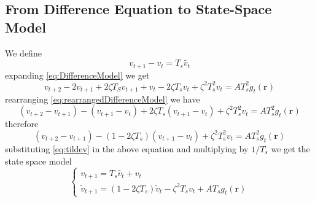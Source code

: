 \documentclass[a4paper,10pt]{article}
\begin{document}
\subsection*{From Difference Equation to State-Space Model}
We define
\begin{equation}\label{eq:tildev}
v_{t+1}-v_t=T_s\tilde{v_t}
\end{equation}
expanding \eqref{eq:DifferenceModel} we get
\begin{equation}\label{eq:rearrangedDifferenceModel}
 v_{t+2}-2v_{t+1}+2\zeta T_S v_{t+1}+v_t-2\zeta T_sv_t+\zeta^2T_s^2v_t=AT_s^2g_t\left( \mathbf{r}\right)
\end{equation}
rearranging \eqref{eq:rearrangedDifferenceModel} we have
\begin{equation}
(v_{t+2}-v_{t+1})-(v_{t+1}-v_t)+2\zeta T_s(v_{t+1}-v_t)+\zeta^2T_s^2v_t=AT_s^2g_t\left( \mathbf{r}\right)
\end{equation}
therefore
\begin{equation}
(v_{t+2}-v_{t+1})-(1-2\zeta T_s)(v_{t+1}-v_t)+\zeta^2T_s^2v_t=AT_s^2g_t\left( \mathbf{r}\right)
\end{equation}
substituting \eqref{eq:tildev} in the above equation and multiplying by $1/T_s$ we get the state space model
\begin{equation}\label{eq:StateSpaceModel}
\begin{cases}
v_{t+1}=T_s\tilde{v_t}+v_t\\
\tilde{v}_{t+1}=(1-2\zeta T_s)\tilde{v}_t-\zeta^2T_sv_t+AT_sg_t\left( \mathbf{r}\right)
\end{cases}
\end{equation}
\end{document}
